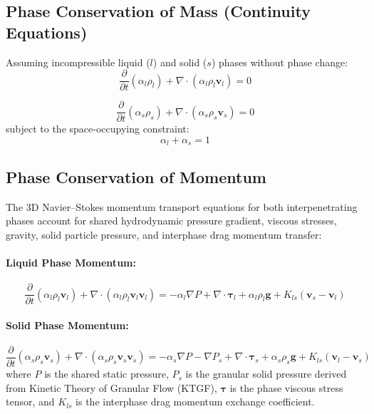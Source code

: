 \documentclass[12pt,a4paper]{article}
\begin{document}
\subsection{Phase Conservation of Mass (Continuity Equations)}
Assuming incompressible liquid ($l$) and solid ($s$) phases without phase change:
\begin{equation}
\frac{\partial}{\partial t} (\alpha_l \rho_l) + \nabla \cdot (\alpha_l \rho_l \mathbf{v}_l) = 0
\end{equation}

\begin{equation}
\frac{\partial}{\partial t} (\alpha_s \rho_s) + \nabla \cdot (\alpha_s \rho_s \mathbf{v}_s) = 0
\end{equation}
subject to the space-occupying constraint:
\begin{equation}
\alpha_l + \alpha_s = 1 
\end{equation}

\subsection{Phase Conservation of Momentum}
The 3D Navier--Stokes momentum transport equations for both interpenetrating phases account for shared hydrodynamic pressure gradient, viscous stresses, gravity, solid particle pressure, and interphase drag momentum transfer:

\paragraph{Liquid Phase Momentum:}
\begin{equation}
\frac{\partial}{\partial t}(\alpha_l \rho_l \mathbf{v}_l) + \nabla \cdot (\alpha_l \rho_l \mathbf{v}_l \mathbf{v}_l) = -\alpha_l \nabla P + \nabla \cdot \boldsymbol{\tau}_l + \alpha_l \rho_l \mathbf{g} + K_{ls}(\mathbf{v}_s - \mathbf{v}_l)
\end{equation}

\paragraph{Solid Phase Momentum:}
\begin{equation}
\frac{\partial}{\partial t}(\alpha_s \rho_s \mathbf{v}_s) + \nabla \cdot (\alpha_s \rho_s \mathbf{v}_s \mathbf{v}_s) = -\alpha_s \nabla P - \nabla P_s + \nabla \cdot \boldsymbol{\tau}_s + \alpha_s \rho_s \mathbf{g} + K_{ls}(\mathbf{v}_l - \mathbf{v}_s)
\end{equation}
where $P$ is the shared static pressure, $P_s$ is the granular solid pressure derived from Kinetic Theory of Granular Flow (KTGF), $\boldsymbol{\tau}$ is the phase viscous stress tensor, and $K_{ls}$ is the interphase drag momentum exchange coefficient.
\end{document}
